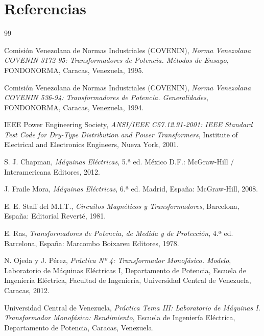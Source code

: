 \section{Referencias}

\begin{thebibliography}{99}

Comisión Venezolana de Normas Industriales (COVENIN), \textit{Norma Venezolana COVENIN 3172-95: Transformadores de Potencia. Métodos de Ensayo}, FONDONORMA, Caracas, Venezuela, 1995.

Comisión Venezolana de Normas Industriales (COVENIN), \textit{Norma Venezolana COVENIN 536-94: Transformadores de Potencia. Generalidades}, FONDONORMA, Caracas, Venezuela, 1994.

IEEE Power Engineering Society, \textit{ANSI/IEEE C57.12.91-2001: IEEE Standard Test Code for Dry-Type Distribution and Power Transformers}, Institute of Electrical and Electronics Engineers, Nueva York, 2001.

S. J. Chapman, \textit{Máquinas Eléctricas}, 5.ª ed. México D.F.: McGraw-Hill / Interamericana Editores, 2012.

J. Fraile Mora, \textit{Máquinas Eléctricas}, 6.ª ed. Madrid, España: McGraw-Hill, 2008.

E. E. Staff del M.I.T., \textit{Circuitos Magnéticos y Transformadores}, Barcelona, España: Editorial Reverté, 1981.

E. Ras, \textit{Transformadores de Potencia, de Medida y de Protección}, 4.ª ed. Barcelona, España: Marcombo Boixareu Editores, 1978.

N. Ojeda y J. Pérez, \textit{Práctica Nº 4: Transformador Monofásico. Modelo}, Laboratorio de Máquinas Eléctricas I, Departamento de Potencia, Escuela de Ingeniería Eléctrica, Facultad de Ingeniería, Universidad Central de Venezuela, Caracas, 2012.

Universidad Central de Venezuela, \textit{Práctica Tema III: Laboratorio de Máquinas I. Transformador Monofásico: Rendimiento}, Escuela de Ingeniería Eléctrica, Departamento de Potencia, Caracas, Venezuela.

\end{thebibliography}
